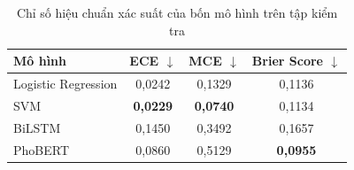 \begin{table}[H]
\centering
\caption{Chỉ số hiệu chuẩn xác suất của bốn mô hình trên tập kiểm tra}
\label{tab:calibration}
\begin{tabular}{lccc}
\toprule
\textbf{Mô hình} & \textbf{ECE} $\downarrow$ & \textbf{MCE} $\downarrow$ & \textbf{Brier Score} $\downarrow$ \\
\midrule
Logistic Regression & 0{,}0242 & 0{,}1329 & 0{,}1136 \\
SVM & \textbf{0{,}0229} & \textbf{0{,}0740} & 0{,}1134 \\
BiLSTM & 0{,}1450 & 0{,}3492 & 0{,}1657 \\
PhoBERT & 0{,}0860 & 0{,}5129 & \textbf{0{,}0955} \\
\bottomrule
\end{tabular}
\end{table}
